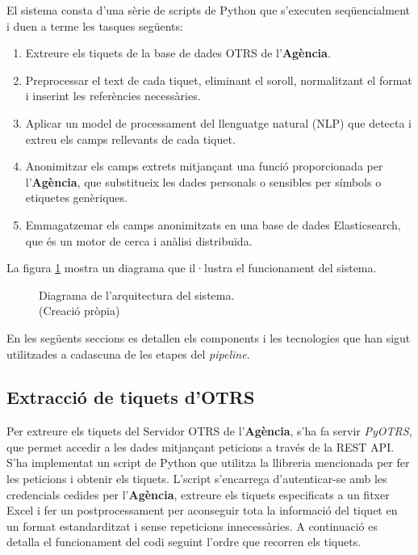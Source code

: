 El sistema consta d'una sèrie de scripts de Python que s'executen seqüencialment i duen a terme les tasques següents:

\begin{enumerate}
     \item Extreure els tiquets de la base de dades OTRS de l'\textbf{Agència}.
     \item Preprocessar el text de cada tiquet, eliminant el soroll, normalitzant el format i inserint les referències necessàries.
     \item Aplicar un model de processament del llenguatge natural (NLP) que detecta i extreu els camps rellevants de cada tiquet.
     \item Anonimitzar els camps extrets mitjançant una funció proporcionada per l'\textbf{Agència}, que substitueix les dades personals o sensibles per símbols o etiquetes genèriques.
     \item Emmagatzemar els camps anonimitzats en una base de dades Elasticsearch, que és un motor de cerca i anàlisi distribuïda.
\end{enumerate}

La figura \ref{fig:pipeline} mostra un diagrama que il·lustra el funcionament del sistema.

\begin{figure}[H]
     \centering
     \vspace{1cm} %
     \setlength{\fboxsep}{5pt} %
     \setlength{\fboxrule}{0pt} %
     \caption[Diagrama de l'arquitectura del sistema]{Diagrama de l'arquitectura del sistema. \\ (Creació pròpia)}
     \label{fig:pipeline}
\end{figure}

En les següents seccions es detallen els components i les tecnologies que han sigut utilitzades a cadascuna de les etapes del \textit{pipeline}.
\subsection{Extracció de tiquets d'OTRS}
Per extreure els tiquets del Servidor OTRS de l'\textbf{Agència}, s'ha fa servir \textit{PyOTRS}, que permet accedir a les dades mitjançant peticions a través de la REST API. S'ha implementat un script de Python que utilitza la llibreria mencionada per fer les peticions i obtenir els tiquets. L'script s'encarrega d'autenticar-se amb les credencials cedides per l'\textbf{Agència}, extreure els tiquets especificats a un fitxer Excel i fer un postprocessament per aconseguir tota la informació del tiquet en un format estandarditzat i sense repeticions innecessàries. A continuació es detalla el funcionament del codi seguint l'ordre que recorren els tiquets.

